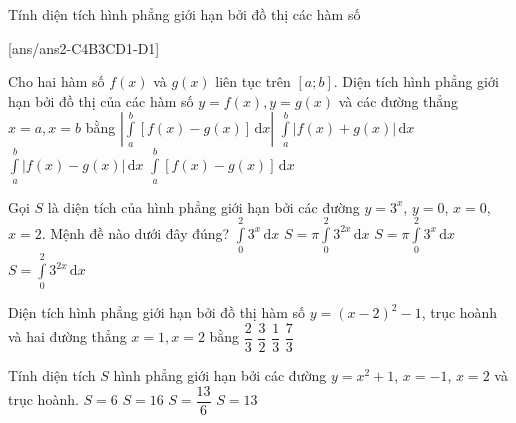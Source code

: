 \begin{dang}{Tính diện tích hình phẳng giới hạn bởi đồ thị các hàm số}
\end{dang}

{}[ans/ans2-C4B3CD1-D1]
\begin{ex}%
	Cho hai hàm số $f(x)$ và $g(x)$ liên tục trên $[a;b]$. Diện tích hình phẳng giới hạn bởi đồ thị của các hàm số $y=f(x), y=g(x)$ và các đường thẳng $x=a, x=b$ bằng
\choice
{$\left|\displaystyle\int\limits_a^b \left[f(x)-g(x)\right]\mathrm{\,d}x\right|$}
{$\displaystyle\int\limits_a^b \left|f(x)+g(x)\right|\mathrm{\,d}x$}
{\True $\displaystyle\int\limits_a^b \left|f(x)-g(x)\right|\mathrm{\,d}x$}
{$\displaystyle\int\limits_a^b \left[f(x)-g(x)\right]\mathrm{\,d}x$}
\end{ex}
\begin{ex}%
	Gọi $S$ là diện tích của hình phẳng giới hạn bởi các đường $y=3^x$, $y=0$, $x=0$, $x=2$. Mệnh đề nào dưới đây đúng?
\choice
{\True $\displaystyle\int\limits_0^2 3^x\mathrm{\,d}x$}
{$S=\pi\displaystyle\int\limits_0^2 3^{2x}\mathrm{\,d}x$}
{$S=\pi\displaystyle\int\limits_0^2 3^x\mathrm{\,d}x$}
{$S=\displaystyle\int\limits_0^2 3^{2x}\mathrm{\,d}x$}

\end{ex}%
\begin{ex}%
	Diện tích hình phẳng giới hạn bởi đồ thị hàm số $y=(x-2)^2-1$, trục hoành và hai đường thẳng $x=1, x=2$ bằng
\choice
{\True $\dfrac{2}{3}$}
{$\dfrac{3}{2}$}
{$\dfrac{1}{3}$}
{$\dfrac{7}{3}$}

\end{ex}
\begin{ex}%
	Tính diện tích $S$ hình phẳng giới hạn bởi các đường $y=x^2+1$, $x=-1$, $x=2$ và trục hoành.
\choice
{\True $S=6$}
{$S=16$}
{$S=\dfrac{13}{6}$}
{$S=13$}
\end{ex}
